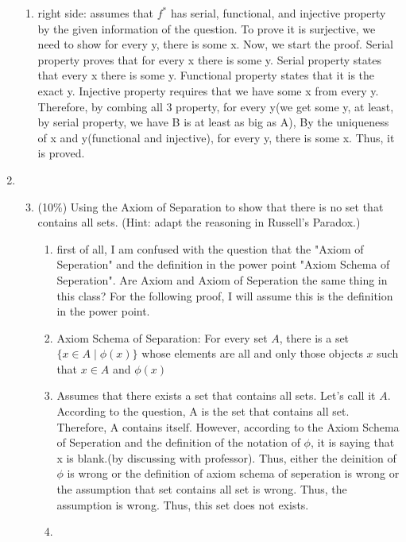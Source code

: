\documentclass[10pt]{article}
\begin{document}
\begin{enumerate}
\begin{enumerate}
    \item right side: assumes that $f^{*}$ has serial, functional, and injective property by the given information of the question. To prove it is surjective, we need to show for every y, there is some x. Now, we start the proof. Serial property proves that for every x there is some y. Serial property states that every x there is some y. Functional property states that it is the exact y. Injective property requires that we have some x from every y. Therefore, by combing all 3 property, for every y(we get some y, at least, by serial property, we have B is at least as big as A), By the uniqueness of x and y(functional and injective), for every y, there is some x. Thus, it is proved.
  \end{enumerate}
  \item 
\begin{enumerate}
  \setcounter{enumi}{2}
  \item (10\%) Using the Axiom of Separation to show that there is no set that contains all sets. (Hint: adapt the reasoning in Russell's Paradox.)
  \begin{enumerate}
    \item first of all, I am confused with the question that the "Axiom of Seperation" and the definition in the power point "Axiom Schema of Seperation". Are Axiom and Axiom of Seperation the same thing in this class? For the following proof, I will assume this is the definition in the power point.
    \item Axiom Schema of Separation:
For every set $A$, there is a set $\{x \in A \mid \phi(x)\}$ whose elements are all and only those objects $x$ such that $x \in A$ and $\phi(x)$
    \item Assumes that there exists a set that contains all sets. Let's call it $A$. According to the question, A is the set that contains all set. Therefore, A contains itself. However, according to the Axiom Schema of Seperation and the definition of the notation of $\phi$, it is saying that x is blank.(by discussing with professor). Thus, either the deinition of $\phi$ is wrong or the definition of axiom schema of seperation is wrong or the assumption that set contains all set is wrong. Thus, the assumption is wrong. Thus, this set does not exists. 
    \item 
  \end{enumerate}


\end{enumerate}
\end{enumerate}
\end{document}
